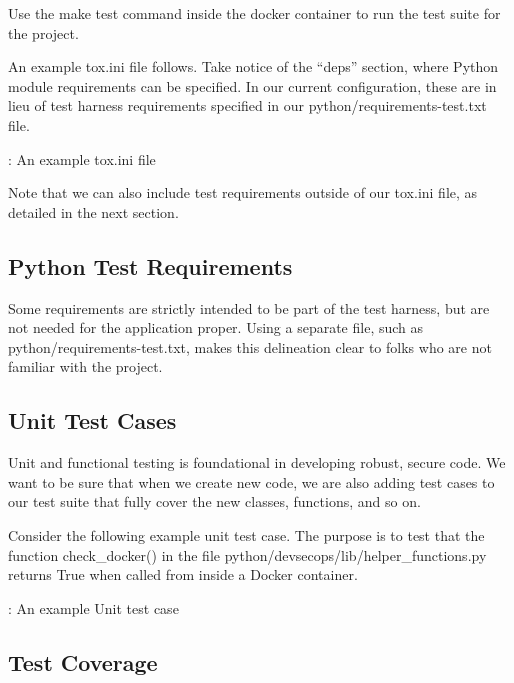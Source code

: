 \justifying
Use the make test command inside the docker container to run the test suite for the project.

\justifying
An example tox.ini file follows. Take notice of the ``deps'' section,
where Python module requirements can be specified. In our current configuration,
these are in lieu of test harness requirements specified in our
python/requirements-test.txt file.

\begin{mybox}{\thetcbcounter: An example tox.ini file}
	
\end{mybox}

\justifying
Note that we can also include test requirements outside of our tox.ini file, as detailed in the next section.

\subsection{Python Test Requirements}

\justifying
Some requirements are strictly intended to be part of the test harness, but are not
needed for the application proper. Using a separate file, such as
python/requirements-test.txt, makes this delineation clear to folks who are not familiar with the project.

\subsection{Unit Test Cases}

\justifying
Unit and functional testing is foundational in developing robust, secure
code. We want to be sure that when we create new code, we are also adding
test cases to our test suite that fully cover the new classes, functions, and so on.

\justifying
Consider the following example unit test case. The purpose is to test
that the function check\_docker() in the file python/devsecops/lib/helper\_functions.py
returns True when called from inside a Docker container.

\begin{mybox}{\thetcbcounter: An example Unit test case}
  
\end{mybox}

\subsection{Test Coverage}

